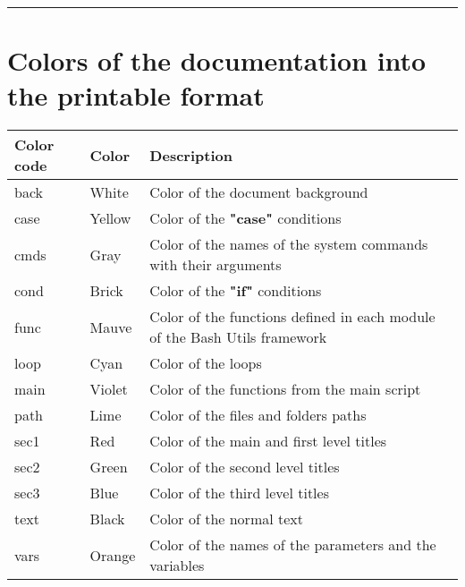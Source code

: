\documentclass[a4paper,10pt]{article}
\begin{document}




\color{sec1}\par\noindent\rule{\textwidth}{0.4pt}\color{text}

\color{red}
\section{Colors of the documentation into the printable format}\color{text}

\begin{justify}
    \begin{tabular}{|l|l|l|}
        \hline
        \textbf{Color code} & \textbf{Color}        & \textbf{Description}\\
        \hline
        \color{text}back    & \color{text}White     & \color{text}Color of the document background\\
        \hline
        \color{case}case    & \color{case}Yellow    & \color{case}Color of the \textbf{"case"} conditions\\
        \hline
        \color{cmds}cmds    & \color{cmds}Gray      & \color{cmds}Color of the names of the system commands with their arguments\\
        \hline
        \color{cond}cond    & \color{cond}Brick     & \color{cond}Color of the \textbf{"if"} conditions\\
        \hline
        \color{func}func    & \color{func}Mauve     & \color{func}Color of the functions defined in each module of the Bash Utils framework\\
        \hline
        \color{loop}loop    & \color{loop}Cyan      & \color{loop}Color of the loops\\
        \hline
        \color{main}main    & \color{main}Violet    & \color{main}Color of the functions from the main script\\
        \hline
        \color{path}path    & \color{path}Lime      & \color{path}Color of the files and folders paths\\
        \hline
        \color{sec1}sec1    & \color{sec1}Red       & \color{sec1}Color of the main and first level titles\\
        \hline
        \color{sec2}sec2    & \color{sec2}Green     & \color{sec2}Color of the second level titles\\
        \hline
        \color{sec3}sec3    & \color{sec3}Blue      & \color{sec3}Color of the third level titles\\
        \hline
        \color{text}text    & \color{text}Black     & \color{text}Color of the normal text\\
        \hline
        \color{vars}vars    & \color{vars}Orange    & \color{vars}Color of the names of the parameters and the variables\\
        \hline

    \end{tabular}
\end{justify}
\end{document}
